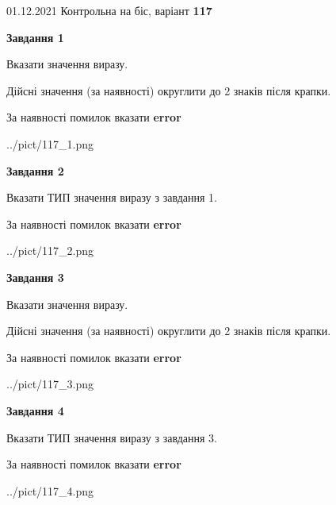 \documentclass[11pt, ukrainian]{article}
\begin{document}
{01.12.2021 Контрольна на біс, варіант  \No \textbf { 117 }\par}
{
\begin {large}
{\begin {center}\textbf{Завдання 1}\end {center}}\par
Вказати значення виразу. \par
Дійсні значення (за наявності) округлити до 2 знаків після крапки. \par
За наявності помилок вказати \textbf{error}

\begin{center}
	{../pict/117_1.png}
\end{center}
\newpage

{\begin {center}\textbf{Завдання 2}\end {center}}\par
Вказати ТИП значення виразу з завдання 1. \par
За наявності помилок вказати \textbf{error}

\begin{center}
	{../pict/117_2.png}
\end{center}
\newpage

{\begin {center}\textbf{Завдання 3}\end {center}}\par
Вказати значення виразу. \par
Дійсні значення (за наявності) округлити до 2 знаків після крапки. \par
За наявності помилок вказати \textbf{error}

\begin{center}
	{../pict/117_3.png}
\end{center}
\newpage

{\begin {center}\textbf{Завдання 4}\end {center}}\par
Вказати ТИП значення виразу з завдання 3. \par
За наявності помилок вказати \textbf{error}

\begin{center}
	{../pict/117_4.png}
\end{center}
\newpage


\end{large}}
\end{document}
